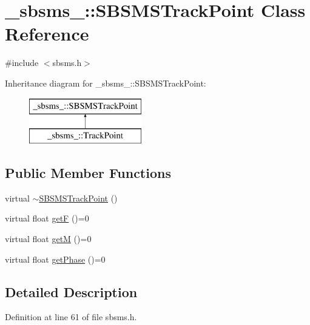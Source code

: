 \hypertarget{class__sbsms___1_1_s_b_s_m_s_track_point}{}\section{\+\_\+sbsms\+\_\+\+:\+:S\+B\+S\+M\+S\+Track\+Point Class Reference}
\label{class__sbsms___1_1_s_b_s_m_s_track_point}


{\ttfamily \#include $<$sbsms.\+h$>$}

Inheritance diagram for \+\_\+sbsms\+\_\+\+:\+:S\+B\+S\+M\+S\+Track\+Point\+:\begin{figure}[H]
\begin{center}
\leavevmode
\includegraphics[height=2.000000cm]{class__sbsms___1_1_s_b_s_m_s_track_point}
\end{center}
\end{figure}
\subsection*{Public Member Functions}
\begin{DoxyCompactItemize}
\item 
virtual \hyperlink{class__sbsms___1_1_s_b_s_m_s_track_point_aa7067a1bbdbe84509bb8ebdb39ddc451}{$\sim$\+S\+B\+S\+M\+S\+Track\+Point} ()
\item 
virtual float \hyperlink{class__sbsms___1_1_s_b_s_m_s_track_point_aefdb58c5daff2a633454099fc012da93}{getF} ()=0
\item 
virtual float \hyperlink{class__sbsms___1_1_s_b_s_m_s_track_point_a4f3a8f5c3b7b9b7e750ec93b07f2ce16}{getM} ()=0
\item 
virtual float \hyperlink{class__sbsms___1_1_s_b_s_m_s_track_point_ac039bc1940fe558cd3a3b3c9e714b007}{get\+Phase} ()=0
\end{DoxyCompactItemize}


\subsection{Detailed Description}


Definition at line 61 of file sbsms.\+h.



